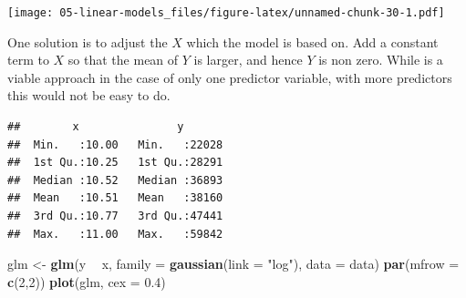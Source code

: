 \documentclass[openany]{book}
\newenvironment{Shaded}{\begin{snugshade}}{\end{snugshade}}
\newcommand{\DataTypeTok}[1]{\textcolor[rgb]{0.13,0.29,0.53}{#1}}
\newcommand{\DecValTok}[1]{\textcolor[rgb]{0.00,0.00,0.81}{#1}}
\newcommand{\FloatTok}[1]{\textcolor[rgb]{0.00,0.00,0.81}{#1}}
\newcommand{\KeywordTok}[1]{\textcolor[rgb]{0.13,0.29,0.53}{\textbf{#1}}}
\newcommand{\NormalTok}[1]{#1}
\newcommand{\OperatorTok}[1]{\textcolor[rgb]{0.81,0.36,0.00}{\textbf{#1}}}
\newcommand{\StringTok}[1]{\textcolor[rgb]{0.31,0.60,0.02}{#1}}
\begin{document}
\begin{Shaded}
\end{Shaded}

\texttt{[image: 05-linear-models\_files/figure-latex/unnamed-chunk-30-1.pdf]}

One solution is to adjust the \(X\) which the model is based on. Add a constant term to \(X\) so that the mean of \(Y\) is larger, and hence \(Y\) is non zero. While is a viable approach in the case of only one predictor variable, with more predictors this would not be easy to do.

\begin{Shaded}
\end{Shaded}

\begin{verbatim}
##        x               y        
##  Min.   :10.00   Min.   :22028  
##  1st Qu.:10.25   1st Qu.:28291  
##  Median :10.52   Median :36893  
##  Mean   :10.51   Mean   :38160  
##  3rd Qu.:10.77   3rd Qu.:47441  
##  Max.   :11.00   Max.   :59842
\end{verbatim}

\begin{Shaded}
\begin{Highlighting}[]
\NormalTok{glm <-}\StringTok{ }\KeywordTok{glm}\NormalTok{(y }\OperatorTok{~}\StringTok{ }\NormalTok{x, }\DataTypeTok{family =} \KeywordTok{gaussian}\NormalTok{(}\DataTypeTok{link =} \StringTok{"log"}\NormalTok{), }\DataTypeTok{data =}\NormalTok{ data)}
\KeywordTok{par}\NormalTok{(}\DataTypeTok{mfrow =} \KeywordTok{c}\NormalTok{(}\DecValTok{2}\NormalTok{,}\DecValTok{2}\NormalTok{))}
\KeywordTok{plot}\NormalTok{(glm, }\DataTypeTok{cex =} \FloatTok{0.4}\NormalTok{)}
\end{Highlighting}
\end{Shaded}
\end{document}
